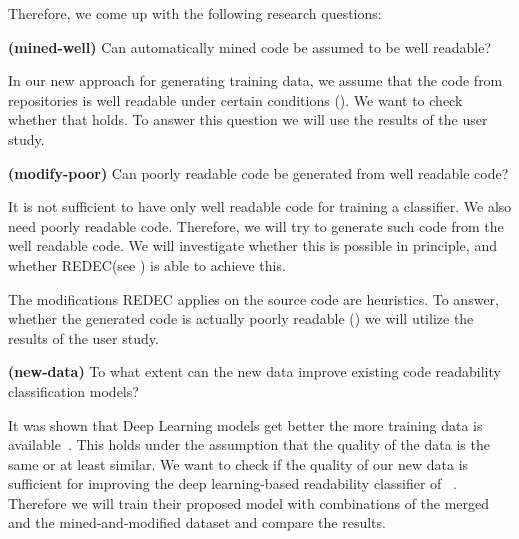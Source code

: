 \documentclass[%
class=scrreprt,
chapterprefix=false,%
open=right,%
twoside=false,%
paper=a4,%
logofile={Logo\_zentral\_farbig\_EN.png},%
thesistype=master,%
UKenglish,%
]{se2thesis}
\theoremstyle{definition}
\newcommand{\rdh}{REDEC\xspace}
\begin{document}
	Therefore, we come up with the following research questions:
	
	\begin{resq} \textbf{(mined-well)} Can automatically mined code be assumed to be well readable?\end{resq} \label{mined-well}
	In our new approach for generating training data, we assume that the code from repositories is well readable under certain conditions (). We want to check whether that holds. To answer this question we will use the results of the user study.
	
	\begin{resq} \textbf{(modify-poor)} Can poorly readable code be generated from well readable code?\end{resq} \label{modify-poor}
	It is not sufficient to have only well readable code for training a classifier. We also need poorly readable code. Therefore, we will try to generate such code from the well readable code. We will investigate whether this is possible in principle, and
	whether \rdh (see ) is able to achieve this.
	
	The modifications \rdh applies on the source code are heuristics. To answer, whether the generated code is actually poorly readable () we will utilize the results of the user study.
	
	
	\begin{resq} \textbf{(new-data)} To what extent can the new data improve existing code readability classification models?\end{resq} \label{new-data}
	It was shown that Deep Learning models get better the more training data is available~\cite{hestness2017deep}. This holds under the assumption that the quality of the data is the same or at least similar. We want to check if the quality of our new data is sufficient for improving the deep learning-based readability classifier of \citeauthor{mi2022towards}~\cite{mi2022towards}. Therefore we will train their proposed model with combinations of the merged and the mined-and-modified dataset and compare the results.
\end{document}
